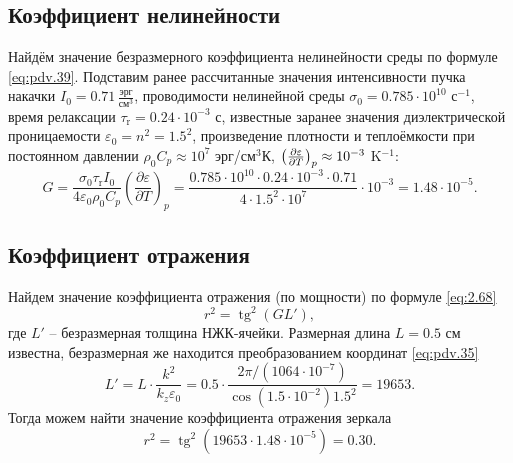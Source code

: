 \documentclass[a4paper,14pt]{extarticle}
\begin{document}
\subsection{Коэффициент нелинейности}
Найдём значение безразмерного коэффициента нелинейности среды по формуле \eqref{eq:pdv.39}. Подставим ранее рассчитанные значения интенсивности пучка накачки $I_0 = 0.71 \,\frac{\text{эрг}}{\text{см}^3}$, проводимости нелинейной среды $\sigma_0 = 0.785\cdot 10^{10} \text{ с}^{-1}$, время релаксации $\tau_\text{r} = 0.24\cdot 10^{-3}$ с, известные заранее значения диэлектрической проницаемости $\varepsilon_0 = n^2 = 1.5^2$, произведение плотности и теплоёмкости при постоянном давлении $\rho_0 C_p\approx 10^7$ эрг/см${}^3$К, $\qty(\pdv{\varepsilon}{T})_p\approx 10^{-3}$ K${}^{-1}$:
\begin{equation}
	\label{eq:exp.pdv.39}
	G = \frac{\sigma_0 \tau_\text{r} I_0}{4 \varepsilon_0 \rho_0 C_p} \left(\frac{\partial \varepsilon}{\partial T}\right)_p = 
	\frac{0.785\cdot 10^{10} \cdot 0.24\cdot10^{-3} \cdot 0.71}{4\cdot {1.5}^2\cdot 10^7}\cdot 10^{-3} = 1.48\cdot 10^{-5}.
\end{equation}


\subsection{Коэффициент отражения}
Найдем значение коэффициента отражения (по мощности) по формуле \eqref{eq:2.68}
\begin{equation}
	\label{eq:exp.2.68}
	r^{2}=\operatorname{tg}^{2}(G L'),
\end{equation}
где $L'$ -- безразмерная толщина НЖК-ячейки. Размерная длина $L=0.5$ см известна, безразмерная же находится преобразованием координат \eqref{eq:pdv.35}
\begin{equation}
	L' = L \cdot \frac{k^2}{k_z \varepsilon_0} = 0.5 \cdot \frac{2\pi / (1064\cdot10^{-7})}{\cos{(1.5\cdot10^{-2})}{1.5}^2} = 19653.
\end{equation}
Тогда можем найти значение коэффициента отражения зеркала 
\begin{equation}
	r^2 = \operatorname{tg}^{2}(19653 \cdot 1.48\cdot 10^{-5})=0.30.
\end{equation}
\end{document}
